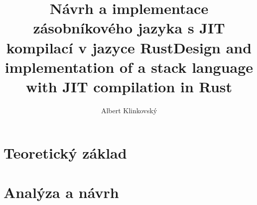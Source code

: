 \documentclass[
  biblatex,
  figures=false,
  sourcecodes,
  glossaries,
]{kidiplom}
\title{Návrh a implementace zásobníkového jazyka s JIT kompilací v jazyce Rust}
\title[english]{Design and implementation of a stack language with JIT compilation in Rust}
\author{Albert Klinkovský}
\begin{document}
\maketitle

\newcommand{\Roth}{\textsc{Roth}}
\newcommand{\Forth}{\textsc{Forth}}




\section{Teoretický základ}
\label{sec:teorie}








\section{Analýza a návrh}
\label{sec:navrh}













\appendix



\nocite{*}
\printbibliography
\end{document}
